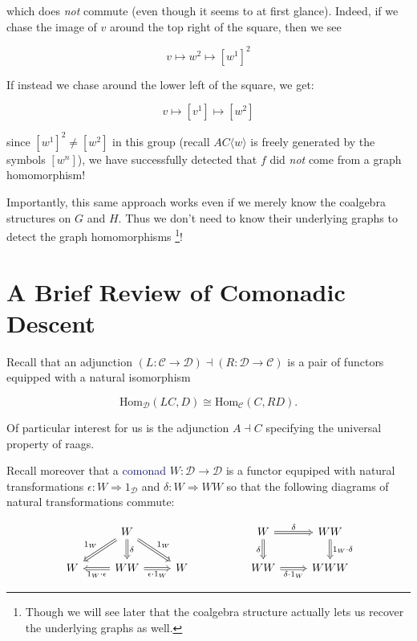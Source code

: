 \documentclass[12pt]{article}
\theoremstyle{definition}
\theoremstyle{theorem}
\newcommand*{\catVarFont}[1]{\mathcal{#1}}
\newcommand{\catC}{\catVarFont{C}}
\newcommand{\catD}{\catVarFont{D}}
\newcommand*{\important}[1]{\textcolor{MidnightBlue}{#1}}
\begin{document}
which does \emph{not} commute (even though it seems to at first glance). 
Indeed, if we chase the image of $v$ around the top right of the square, then 
we see

\[ v \mapsto w^2 \mapsto [w^1]^2 \]

If instead we chase around the lower left of the square, we get:

\[ v \mapsto [v^1] \mapsto [w^2] \]

since $[w^1]^2 \neq [w^2]$ in this group (recall $AC \langle w \rangle$ is 
freely generated by the symbols $[w^n]$), we have successfully detected that 
$f$ did \emph{not} come from a graph homomorphism!

Importantly, this same approach works even if we merely know the 
coalgebra structures on $G$ and $H$. Thus we don't need to know their
underlying graphs to detect the graph homomorphisms%
\footnote{Though we will see later that the coalgebra structure 
actually lets us recover the underlying graphs as well.}! 

\section{A Brief Review of Comonadic Descent}
\label{review}

Recall that an adjunction
$(L : \catC \to \catD) \dashv (R : \catD \to \catC)$ is a 
pair of functors equipped with a natural isomorphism

\[ \text{Hom}_\mathcal{D}(LC,D) \cong \text{Hom}_\mathcal{C}(C,RD). \]

Of particular interest for us is the adjunction $A \dashv C$ specifying the 
universal property of raags.

Recall moreover that a \important{comonad} $W : \catD \to \catD$ is a 
functor equpiped with natural transformations $\epsilon : W \Rightarrow 1_\catD$ 
and $\delta : W \Rightarrow WW$ so that the following diagrams of 
natural transformations commute:

\[
    \begin{tikzcd}
    & W &&& W & WW \\
    W & WW & W && WW & WWW
    \arrow["{1_W \cdot \epsilon}", Rightarrow, from=2-2, to=2-1]
    \arrow["{\epsilon \cdot 1_W}"', Rightarrow, from=2-2, to=2-3]
    \arrow["\delta", Rightarrow, from=1-2, to=2-2]
    \arrow["{1_W}"', Rightarrow, from=1-2, to=2-1]
    \arrow["{1_W}", Rightarrow, from=1-2, to=2-3]
    \arrow["\delta"', Rightarrow, from=1-5, to=2-5]
    \arrow["\delta", Rightarrow, from=1-5, to=1-6]
    \arrow["{\delta \cdot 1_W}"', Rightarrow, from=2-5, to=2-6]
    \arrow["{1_W \cdot \delta}", Rightarrow, from=1-6, to=2-6]
    \end{tikzcd}
\]
\end{document}
